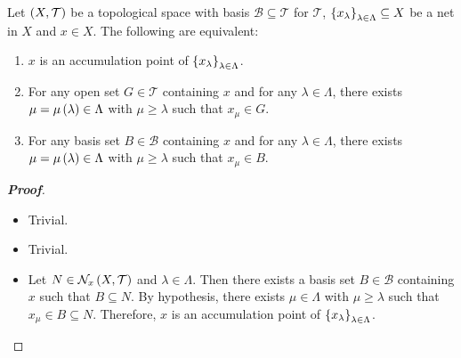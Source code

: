 \begin{proposition}
  Let $\left(X,\mathcal{T}\right)$ be a topological space with basis $\mathcal{B}\subseteq\mathcal{T}$ for $\mathcal{T}$, $\left\{x_{\lambda}\right\}_{\lambda\in\Lambda}\subseteq X$ be a net in $X$ and $x\in X$. The following are equivalent:

  \begin{enumerate}
    \item $x$ is an accumulation point of $\left\{x_{\lambda}\right\}_{\lambda\in\Lambda}$.
    \item For any open set $G\in\mathcal{T}$ containing $x$ and for any $\lambda\in\Lambda$, there exists $\mu=\mu\left(\lambda\right)\in\Lambda$ with $\mu\geq\lambda$ such that $x_{\mu}\in G$.
    \item For any basis set $B\in\mathcal{B}$ containing $x$ and for any $\lambda\in\Lambda$, there exists $\mu=\mu\left(\lambda\right)\in\Lambda$ with $\mu\geq\lambda$ such that $x_{\mu}\in B$.
  \end{enumerate}
  \begin{proof}[\rm\textbf{Proof}]
    \hfill
    \begin{itemize}
      \item[\boxed{1\Rightarrow2}] Trivial.
      \item[\boxed{2\Rightarrow3}] Trivial.
      \item[\boxed{3\Rightarrow1}] Let $N\in\mathcal{N}_x\left(X,\mathcal{T}\right)$ and $\lambda\in\Lambda$. Then there exists a basis set $B\in\mathcal{B}$ containing $x$ such that $B\subseteq N$. By hypothesis, there exists $\mu\in\Lambda$ with $\mu\geq\lambda$ such that $x_{\mu}\in B\subseteq N$. Therefore, $x$ is an accumulation point of $\left\{x_{\lambda}\right\}_{\lambda\in\Lambda}$.
    \end{itemize}
  \end{proof}
\end{proposition}

